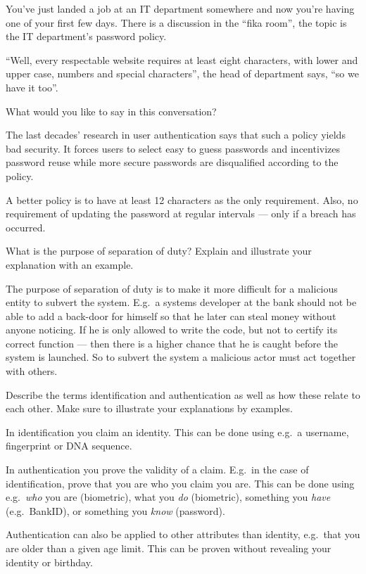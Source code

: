 \question[3]
You've just landed a job at an IT department somewhere and now you're having one 
of your first few days.
There is a discussion in the \enquote{fika room}, the topic is the IT 
department's password policy.

\enquote{Well, every respectable website requires at least eight characters, 
with lower and upper case, numbers and special characters}, the head of 
department says, \enquote{so we have it too}.

What would you like to say in this conversation?

\begin{solution}
The last decades' research in user authentication says that such a policy yields 
bad security.
It forces users to select easy to guess passwords and incentivizes password 
reuse while more secure passwords are disqualified according to the policy.

A better policy is to have at least 12 characters as the only requirement.
Also, no requirement of updating the password at regular intervals --- only if a 
breach has occurred.
\end{solution}
\question[3]
What is the purpose of separation of duty?
Explain and illustrate your explanation with an example.

\begin{solution}
  The purpose of separation of duty is to make it more difficult for 
  a malicious entity to subvert the system.
  E.g.\ a systems developer at the bank should not be able to add a back-door 
  for himself so that he later can steal money without anyone noticing.
  If he is only allowed to write the code, but not to certify its correct 
  function --- then there is a higher chance that he is caught before the 
  system is launched.
  So to subvert the system a malicious actor must act together with others.
\end{solution}


\question[3]
  Describe the terms
  identification and
  authentication as well as
  how these relate to each other.
  Make sure to illustrate your explanations by examples.

  \begin{solution}
    In identification you claim an identity.
    This can be done using e.g.~a username, fingerprint or DNA sequence.

    In authentication you prove the validity of a claim.
    E.g.\ in the case of identification, prove that you are who you claim you 
    are.
    This can be done using e.g.~\emph{who} you are (biometric), what you 
    \emph{do} (biometric), something you \emph{have} (e.g.~BankID), or something 
    you \emph{know} (password).

    Authentication can also be applied to other attributes than identity, e.g.\ 
    that you are older than a given age limit.
    This can be proven without revealing your identity or birthday.
  \end{solution}


